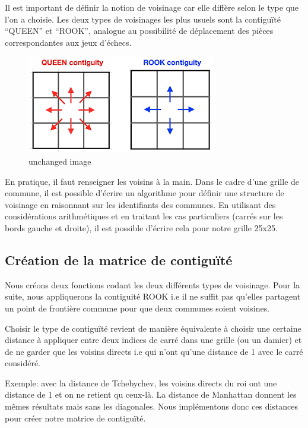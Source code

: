 \documentclass[
]{article}
\begin{document}
Il est important de définir la notion de voisinage car elle diffère
selon le type que l'on a choisie. Les deux types de voisinages les plus
usuels sont la contiguïté ``QUEEN'' et ``ROOK'', analogue au possibilité
de déplacement des pièces correspondantes aux jeux d'échecs.

\begin{figure}
\centering
\includegraphics{Templates/contiguite.png}
\caption{unchanged image}
\end{figure}

En pratique, il faut renseigner les voisins à la main. Dans le cadre
d'une grille de commune, il est possible d'écrire un algorithme pour
définir une structure de voisinage en raisonnant sur les identifiants
des communes. En utilisant des considérations arithmétiques et en
traitant les cas particuliers (carrés sur les bords gauche et droite),
il est possible d'écrire cela pour notre grille 25x25.

\hypertarget{cruxe9ation-de-la-matrice-de-contiguuxeftuxe9}{%
\subsection{Création de la matrice de
contiguïté}\label{cruxe9ation-de-la-matrice-de-contiguuxeftuxe9}}

Nous créons deux fonctions codant les deux différents types de
voisinage. Pour la suite, nous appliquerons la contiguité ROOK i.e il ne
suffit pas qu'elles partagent un point de frontière commune pour que
deux communes soient voisines.

Choisir le type de contiguïté revient de manière équivalente à choisir
une certaine distance à appliquer entre deux indices de carré dans une
grille (ou un damier) et de ne garder que les voisins directs i.e qui
n'ont qu'une distance de 1 avec le carré considéré.

Exemple: avec la distance de Tchebychev, les voisins directs du roi ont
une distance de 1 et on ne retient qu ceux-là. La distance de Manhattan
donnent les mêmes résultats mais sans les diagonales. Nous implémentons
donc ces distances pour créer notre matrice de contiguïté.
\end{document}
